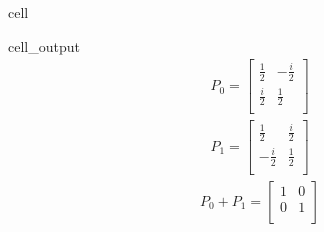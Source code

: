 \documentclass[letterpaper,10pt,english]{jupyterBook}
\begin{document}
\begin{sphinxuseclass}{cell}
\begin{sphinxVerbatimOutput}
\begin{sphinxuseclass}{cell_output}\begin{equation*}
\begin{split}
P_0=
\begin{bmatrix}
\frac{1}{2} & - \frac{i}{2}  \\
 \frac{i}{2} & \frac{1}{2}  \\
 \end{bmatrix}
\end{split}
\end{equation*}\begin{equation*}
\begin{split}
P_1=
\begin{bmatrix}
\frac{1}{2} & \frac{i}{2}  \\
 - \frac{i}{2} & \frac{1}{2}  \\
 \end{bmatrix}
\end{split}
\end{equation*}\begin{equation*}
\begin{split}
P_0 + P_1=
\begin{bmatrix}
1 & 0  \\
 0 & 1  \\
 \end{bmatrix}
\end{split}
\end{equation*}
\end{sphinxuseclass}\end{sphinxVerbatimOutput}

\end{sphinxuseclass}
\end{document}
